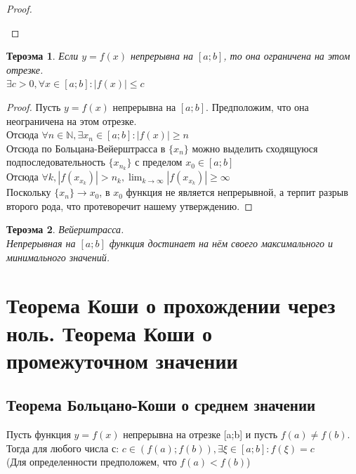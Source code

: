 \documentclass[oneside]{book}
\newtheorem{thm}{Тероэма}[chapter] %
\begin{document}
\begin{enumerate}
\begin{proof}
\begin{center}
    \end{center}
\end{proof}
\begin{thm}
Если $y = f(x)$ непрерывна на $[a; b]$, то она ограничена на этом отрезке. \\
$ \exists c > 0, \forall x \in [a;b]: |f(x)| \leq c $
\end{thm}
\begin{proof}
    Пусть $y = f(x)$ непрерывна на $[a; b]$. Предположим, что она неограничена на этом отрезке. \\
    Отсюда $\forall n \in \mathbb{N}, \exists x_n \in [a;b]: |f(x)| \geq n$\\
    Отсюда по Больцана-Вейерштрасса в $\{x_n\}$ можно выделить сходящуюся подпоследовательность $\{x_{n_k}\}$ с пределом $x_0 \in [a; b]$\\
    Отсюда $\forall k, |f(x_{x_k})| > n_k, \lim_{k \rightarrow \infty}{|f(x_{x_k})|} \geq \infty$ \\
    Поскольку $\{x_n\} \rightarrow x_0$, в $x_0$ функция не является непрерывной, а терпит разрыв второго рода, что протеворечит нашему утверждению.
\end{proof}

\begin{thm}
    Вейерштрасса. \\
    Непрерывная на $[a; b]$ функция достинает на нём своего максимального и минимального значений.
\end{thm}


\setcounter{chapter}{15}
\chapter {Теорема Коши о прохождении через ноль. Теорема Коши о промежуточном значении}
\section{Теорема Больцано-Коши о среднем значении}
Пусть функция $y = f(x)$ непрерывна на отрезке [a;b] и пусть $f(a)\neq f(b)$. Тогда для любого числа с: $c \in (f(a); f(b)), \exists \xi \in [a; b]: f(\xi)=c$
\\(Для определенности предположем, что $f(a)<f(b)$)

\end{enumerate}
\end{document}
